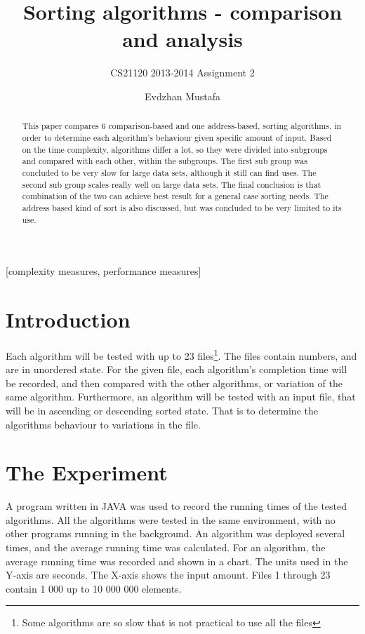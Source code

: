 \documentclass{acm_proc_article-sp}
\begin{document}
\title{Sorting algorithms - comparison and analysis }
\subtitle{ CS21120 2013-2014 Assignment 2 }
\author{
\alignauthor
Evdzhan Mustafa\\
}
\maketitle
\begin{abstract}
This paper compares 6 comparison-based and one address-based, sorting algorithms, in order to determine each algorithm's behaviour given specific amount of input. Based on the time complexity, algorithms differ a lot, so they were divided into subgroups and compared with each other, within the subgroups. The first sub group was concluded to be very slow for large data sets, although it still can find uses. The second sub group scales really well on large data sets. The final conclusion is that combination of the two can achieve best result for a general case sorting needs. The address based kind of sort is also discussed, but was concluded to be very limited to its use.
\end{abstract}
[complexity measures, performance measures]
\section{Introduction}
Each algorithm will be tested with up to 23 files\footnote{Some algorithms are so slow that is not practical to use all the files}. The files contain numbers, and are in unordered state. For the given file, each algorithm's completion time will be recorded, and then compared with the other algorithms, or variation of the same algorithm. Furthermore, an algorithm will be tested with an input file, that will be in ascending or descending sorted state. That is to determine the algorithms behaviour to variations in the file.
\section{The {\secit Experiment }}
A program written in JAVA was used to record the running times of the tested algorithms. All the algorithms were tested in the same environment, with no other programs running in the background. An algorithm was deployed several times, and the average running time was calculated. For an algorithm, the average running time was recorded and shown in a chart. The units used in the Y-axis are seconds. The X-axis shows the input amount. Files 1 through 23 contain 1 000 up to 10 000 000 elements.
\end{document}
